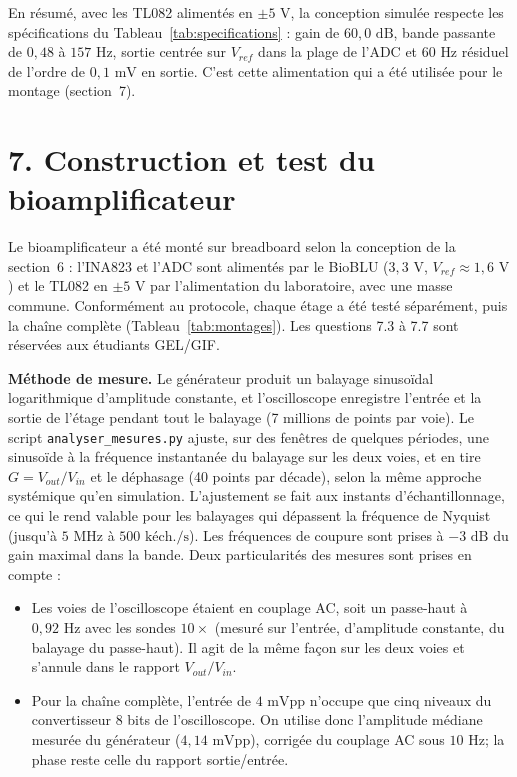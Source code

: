 \documentclass[11pt,letterpaper]{article}
\begin{document}
En résumé, avec les TL082 alimentés en $\pm 5\text{ V}$, la conception simulée respecte les spécifications du Tableau~\ref{tab:specifications} : gain de $60,0\text{ dB}$, bande passante de $0,48$ à $157\text{ Hz}$, sortie centrée sur $V_{ref}$ dans la plage de l'ADC et $60\text{ Hz}$ résiduel de l'ordre de $0,1\text{ mV}$ en sortie. C'est cette alimentation qui a été utilisée pour le montage (section~7).

\FloatBarrier
\section*{7. Construction et test du bioamplificateur}

Le bioamplificateur a été monté sur breadboard selon la conception de la section~6 : l'INA823 et l'ADC sont alimentés par le BioBLU ($3,3\text{ V}$, $V_{ref} \approx 1,6\text{ V}$) et le TL082 en $\pm 5\text{ V}$ par l'alimentation du laboratoire, avec une masse commune. Conformément au protocole, chaque étage a été testé séparément, puis la chaîne complète (Tableau~\ref{tab:montages}). Les questions 7.3 à 7.7 sont réservées aux étudiants GEL/GIF.

\textbf{Méthode de mesure.} Le générateur produit un balayage sinusoïdal logarithmique d'amplitude constante, et l'oscilloscope enregistre l'entrée et la sortie de l'étage pendant tout le balayage (7 millions de points par voie). Le script \texttt{analyser\_mesures.py} ajuste, sur des fenêtres de quelques périodes, une sinusoïde à la fréquence instantanée du balayage sur les deux voies, et en tire $G = V_{out}/V_{in}$ et le déphasage (40 points par décade), selon la même approche systémique qu'en simulation. L'ajustement se fait aux instants d'échantillonnage, ce qui le rend valable pour les balayages qui dépassent la fréquence de Nyquist (jusqu'à $5\text{ MHz}$ à $500\text{ kéch./s}$). Les fréquences de coupure sont prises à $-3\text{ dB}$ du gain maximal dans la bande. Deux particularités des mesures sont prises en compte :
\begin{itemize}
\item Les voies de l'oscilloscope étaient en couplage AC, soit un passe-haut à $0,92\text{ Hz}$ avec les sondes $10\times$ (mesuré sur l'entrée, d'amplitude constante, du balayage du passe-haut). Il agit de la même façon sur les deux voies et s'annule dans le rapport $V_{out}/V_{in}$.
\item Pour la chaîne complète, l'entrée de $4\text{ mVpp}$ n'occupe que cinq niveaux du convertisseur 8 bits de l'oscilloscope. On utilise donc l'amplitude médiane mesurée du générateur ($4,14\text{ mVpp}$), corrigée du couplage AC sous $10\text{ Hz}$; la phase reste celle du rapport sortie/entrée.
\end{itemize}
\end{document}

